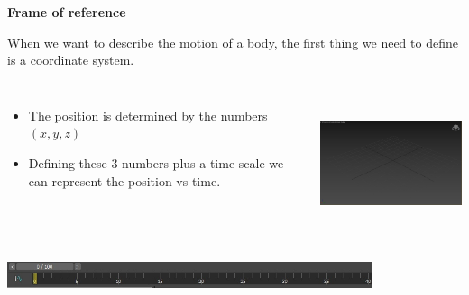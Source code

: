 \documentclass[]{beamer}
\begin{document}




   \begin{frame}

    \textbf{Frame of reference}
    \vspace{3mm}
    
     When we want to describe the motion of a body, the first thing we need to define 
    is a coordinate system.
     
    
    
    
    
       \begin{columns}[c]
       \column{2in}  %
      
    \pause
    \begin{itemize}
    \item The position is determined by the numbers $(x,y,z)$ 
    \pause
    \item Defining these 3 numbers plus a time scale we can represent  the position vs time. 
    \end{itemize}
    
       \column{2.5in}
      \begin{center}
      \includegraphics[height=1.6in]{images/reference_frame.jpg}
    \end{center}
    
       \end{columns}
    \pause
    
      \begin{center}
      \includegraphics[height=0.3in]{images/time_line.jpg}
    \end{center}
    
     \end{frame}
    
    
    
  
\end{document}
